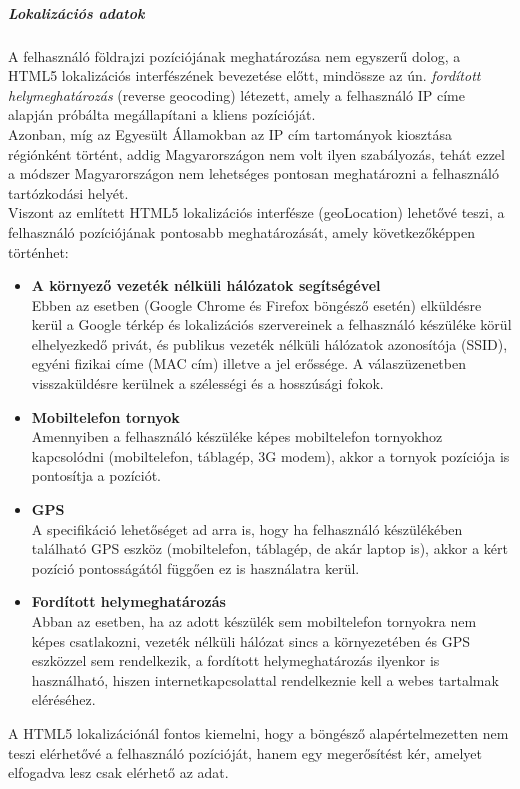 \subparagraph{Lokalizációs adatok} %
\label{subp:lokalizációs_adatok}
A felhasználó földrajzi pozíciójának meghatározása nem egyszerű dolog, a HTML5 lokalizációs interfészének bevezetése előtt, mindössze az ún. \textit{fordított helymeghatározás} (reverse geocoding) létezett, amely a felhasználó IP címe alapján próbálta megállapítani a kliens pozícióját.\hfill\\
Azonban, míg az Egyesült Államokban az IP cím tartományok kiosztása régiónként történt, addig Magyarországon nem volt ilyen szabályozás, tehát ezzel a módszer Magyarországon nem lehetséges pontosan meghatározni a felhasználó tartózkodási helyét.\hfill\\
Viszont az említett HTML5 lokalizációs interfésze (geoLocation) lehetővé teszi, a felhasználó pozíciójának pontosabb meghatározását, amely következőképpen történhet:
\begin{itemize}
	\item{\textbf{A környező vezeték nélküli hálózatok segítségével}}\hfill\\
		Ebben az esetben (Google Chrome és Firefox böngésző esetén) elküldésre kerül a Google térkép és lokalizációs szervereinek a felhasználó készüléke körül elhelyezkedő privát, és publikus vezeték nélküli hálózatok azonosítója (SSID), egyéni fizikai címe (MAC cím) illetve a jel erőssége. A válaszüzenetben visszaküldésre kerülnek a szélességi és a hosszúsági fokok.
	\item{\textbf{Mobiltelefon tornyok}}\hfill\\
		Amennyiben a felhasználó készüléke képes mobiltelefon tornyokhoz kapcsolódni (mobiltelefon, táblagép, 3G modem), akkor a tornyok pozíciója is pontosítja a pozíciót.
	\item{\textbf{GPS}}\hfill\\
		A specifikáció lehetőséget ad arra is, hogy ha felhasználó készülékében található GPS eszköz (mobiltelefon, táblagép, de akár laptop is), akkor a kért pozíció pontosságától függően ez is használatra kerül.
	\item{\textbf{Fordított helymeghatározás}}\hfill\\
		Abban az esetben, ha az adott készülék sem mobiltelefon tornyokra nem képes csatlakozni, vezeték nélküli hálózat sincs a környezetében és GPS eszközzel sem rendelkezik, a fordított helymeghatározás ilyenkor is használható, hiszen internetkapcsolattal rendelkeznie kell a webes tartalmak eléréséhez.
\end{itemize}

A HTML5 lokalizációnál fontos kiemelni, hogy a böngésző alapértelmezetten nem teszi elérhetővé a felhasználó pozícióját, hanem egy megerősítést kér, amelyet elfogadva lesz csak elérhető az adat.

